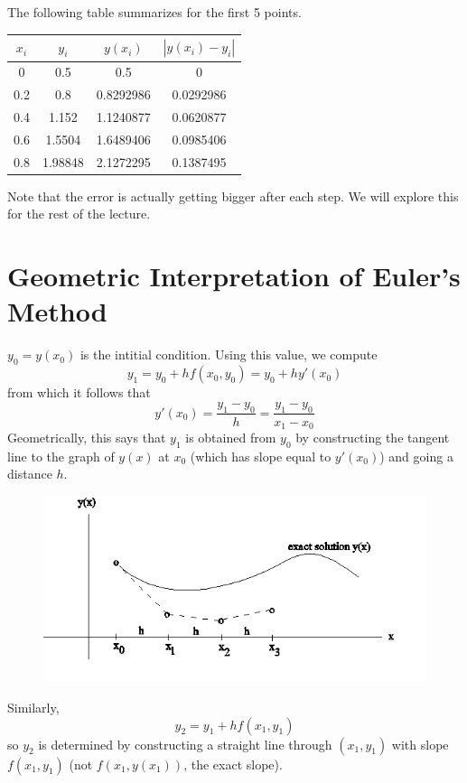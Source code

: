 \documentclass [titlepage,12pt,letter] {article}
\begin{document}
The following table summarizes for the first 5 points.

\begin{center}
\begin{tabular}{c|c|c|c}
$x_i$ & $y_i$ & $y(x_i)$ & $|y(x_i)-y_i|$ \\
\hline
0 & 0.5 & 0.5 & 0 \\
0.2 & 0.8 & 0.8292986 & 0.0292986 \\
0.4 & 1.152 & 1.1240877 & 0.0620877 \\
0.6 & 1.5504 & 1.6489406 & 0.0985406 \\
0.8 & 1.98848 & 2.1272295 & 0.1387495
\end{tabular}
\end{center}

Note that the error is actually getting bigger after each step. We will explore this for the rest of the lecture.

\section{Geometric Interpretation of Euler's Method}

$y_0=y(x_0)$ is the intitial condition. Using this value, we compute
\[
y_1=y_0+hf(x_0,y_0)=y_0+hy'(x_0)
\]
from which it follows that
\[
y'(x_0)=\frac{y_1-y_0}{h}=\frac{y_1-y_0}{x_1-x_0}
\]
Geometrically, this says that $y_1$ is obtained from $y_0$ by constructing the tangent line to the graph of $y(x)$ at $x_0$ (which has slope equal to $y'(x_0)$) and going a distance $h$.

\begin{figure}[h] 
  \centering
  \includegraphics[scale=0.65]{eulers}
  \label{fig:eulers}
\end{figure}

Similarly,
\[
y_2=y_1+hf(x_1,y_1)
\]
so $y_2$ is determined by constructing a straight line through $(x_1,y_1)$ with slope $f(x_1,y_1)$ (not $f(x_1,y(x_1))$, the exact slope).  
\end{document}
